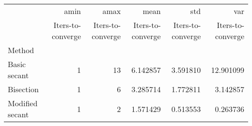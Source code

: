 \begin{tabular}{lrrrrr}
\toprule
{} &              amin &              amax &              mean &               std &               var \\
{} & Iters-to-converge & Iters-to-converge & Iters-to-converge & Iters-to-converge & Iters-to-converge \\
Method          &                   &                   &                   &                   &                   \\
\midrule
Basic secant    &                 1 &                13 &          6.142857 &          3.591810 &         12.901099 \\
Bisection       &                 1 &                 6 &          3.285714 &          1.772811 &          3.142857 \\
Modified secant &                 1 &                 2 &          1.571429 &          0.513553 &          0.263736 \\
\bottomrule
\end{tabular}
